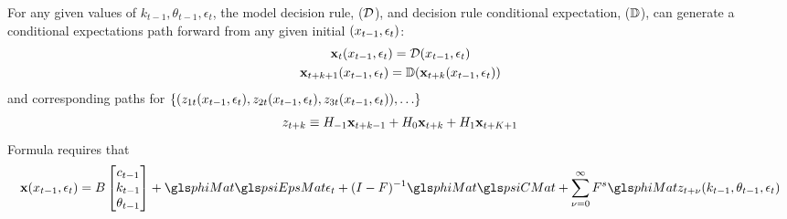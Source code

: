 \documentclass[12pt]{article}
\begin{document}
For any given values of $k_{t-1},\theta_{t-1}, \epsilon_t$, the model decision rule, ($\mathcal{D}$), and decision rule conditional expectation, ($\mathbb{D}$), can generate a conditional expectations path forward from  any given initial $(x_{t-1},\epsilon_t)$:
\begin{gather*}
  \mathbf{x}_t({x_{t-1},\epsilon_t})=\mathcal{D}({x_{t-1},\epsilon_t})\\
  \mathbf{x}_{t+k+1}({x_{t-1},\epsilon_t})=\mathbb{D}(\mathbf{x}_{t+k}({x_{t-1},\epsilon_t}))
\end{gather*}
and corresponding paths for $\{(z_{1t}(x_{t-1},\epsilon_t), z_{2t}(x_{t-1},\epsilon_t), z_{3t}(x_{t-1},\epsilon_t)),\ldots\}$
\begin{gather*}
  z_{t+k} \equiv H_{-1} \mathbf{x}_{t+k-1} +  H_0 \mathbf{x}_{t+k} +  H_1 \mathbf{x}_{t+K+1} 
\end{gather*}
Formula  requires that
\begin{gather*}
\xWOarg(\xtmEpsArg)=
B   \begin{bmatrix}
c_{t-1}\\
k_{t-1}\\
\theta_{t-1}
  \end{bmatrix}  + \phiMat \psiEpsMat\epsilon_t + (I - F)^{-1} \phiMat \psiCMat + \sum_{\sForSum=0}^\infty F^s \phiMat z_{t+\sForSum}(k_{t-1},\theta_{t-1}, \epsilon_t) 
\end{gather*}
\end{document}
